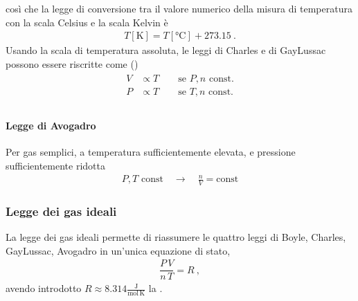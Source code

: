 \documentclass[letterpaper,10pt,italian]{jupyterBook}
\begin{document}
\sphinxAtStartPar
così che la legge di conversione tra il valore numerico della misura di temperatura con la scala Celsius e la scala Kelvin è
\begin{equation*}
\begin{split}T[\text{K}] = T[\text{°C}] + 273.15 \ .\end{split}
\end{equation*}
\sphinxAtStartPar
Usando la scala di temperatura assoluta, le leggi di Charles e di Gay\sphinxhyphen{}Lussac possono essere riscritte come  ()
\begin{equation*}
\begin{split}\begin{aligned}
  V & \propto T \qquad \text{se $P, n$ const.} \\
  P & \propto T \qquad \text{se $T, n$ const.} \\
\end{aligned}\end{split}
\end{equation*}

\paragraph{Legge di Avogadro}
\label{\detokenize{ch/thermodynamics/ideal-gas-experiments:legge-di-avogadro}}
\sphinxAtStartPar
Per gas semplici, a temperatura sufficientemente elevata, e pressione sufficientemente ridotta
\begin{equation*}
\begin{split}P, T \text{ const} \quad \rightarrow \quad \frac{n}{V} = \text{const}\end{split}
\end{equation*}

\subsubsection{Legge dei gas ideali}
\label{\detokenize{ch/thermodynamics/ideal-gas-experiments:legge-dei-gas-ideali}}
\sphinxAtStartPar
La legge dei gas ideali permette di riassumere le quattro leggi di Boyle, Charles, Gay\sphinxhyphen{}Lussac, Avogadro in un’unica equazione di stato,
\begin{equation*}
\begin{split}\dfrac{P \, V}{n \, T} = R \ ,\end{split}
\end{equation*}
\sphinxAtStartPar
avendo introdotto \(R \approx 8.314 \frac{\text{J}}{\text{mol} \,\text{K}}\) la .
\end{document}
